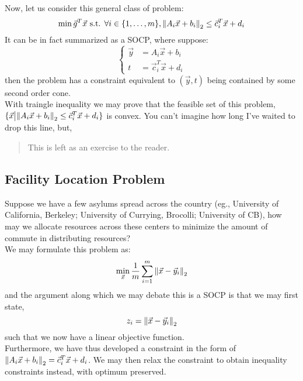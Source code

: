 Now, let us consider this general class of problem:
\[
    \min \vec{g}^T \vec{x} \text{ s.t. } \forall i \in \{1, \dots, m\}, {\| A_i \vec{x} + b_i \|}_{2}^{} \leq \vec{c}_i^T \vec{x} + d_i
\]
It can be in fact summarized as a SOCP, where suppose:
\[
    \begin{cases}
        \vec{y} &= A_i \vec{x} + b_i \\
        t &= \vec{c}_i^T \vec{x} + d_i
    \end{cases}
\]
then the problem has a constraint equivalent to $(\vec{y}, t)$ being contained by some second order cone. \\
With traingle inequality we may prove that the feasible set of this problem, $\{\vec{x} \big| {\| A_i \vec{x} + b_i \|}_{2}^{} \leq \vec{c}_i^T \vec{x} + d_i \}$ is convex.
You can't imagine how long I've waited to drop this line, but,
\begin{quote}
    This is left as an exercise to the reader.
\end{quote}

\subsection{Facility Location Problem}
Suppose we have a few asylums spread across the country (eg., University of California, Berkeley; University of Currying, Brocolli; University of CB), how may we allocate resources across these centers to minimize the amount of commute in distributing resources? \\
We may formulate this problem as:
\[
    \min_{\vec{x}} \frac{1}{m} \sum_{i = 1}^m {\| \vec{x} - \vec{y}_i \|}_{2}^{}
\]
and the argument along which we may debate this is a SOCP is that we may first state,
\[
    z_i = {\| \vec{x} - \vec{y}_i \|}_{2}^{}
\]
such that we now have a linear objective function. \\
Furthermore, we have thus developed a constraint in the form of ${\| A_i \vec{x} + b_i \|}_{2}^{} = \vec{c}_i^T \vec{x} + d_i$.
We may then relax the constraint to obtain inequality constraints instead, with optimum preserved.

